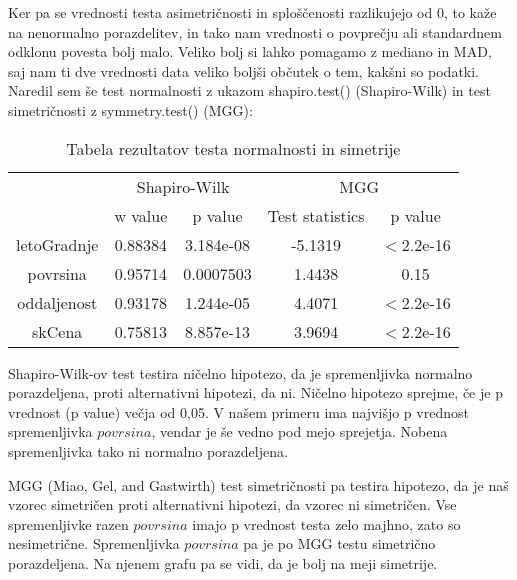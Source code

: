 \documentclass[a4paper, 12pt]{article}
\begin{document}
Ker pa se vrednosti testa asimetričnosti in sploščenosti razlikujejo od $ 0 $,
to kaže na nenormalno porazdelitev, in tako nam vrednosti o povprečju ali
standardnem odklonu povesta bolj malo. Veliko bolj si lahko pomagamo z mediano
in MAD, saj nam ti dve vrednosti data veliko boljši občutek o tem, kakšni so podatki.
Naredil sem še test normalnosti z ukazom {\sf shapiro.test()} (Shapiro-Wilk)
in test simetričnosti z {\sf symmetry.test()} (MGG):

\begin{table}[H]
\begin{center}
\begin{tabular}{ c|cc|cc }
	& \multicolumn{2}{c}{Shapiro-Wilk} & \multicolumn{2}{c}{MGG} \\
	& w value & p value & Test statistics & p value \\
	\hline
	letoGradnje &  0.88384 & 3.184e-08 & -5.1319 & $<$2.2e-16 \\
	povrsina & 0.95714 & 0.0007503 & 1.4438 & 0.15 \\
	oddaljenost & 0.93178 & 1.244e-05 & 4.4071 & $<$2.2e-16 \\
	skCena & 0.75813 & 8.857e-13 & 3.9694 & $<$2.2e-16 \\
\end{tabular}
\caption{Tabela rezultatov testa normalnosti in simetrije}
\label{table:3}
\end{center}
\end{table}

Shapiro-Wilk-ov test testira ničelno hipotezo, da je spremenljivka normalno
porazdeljena, proti alternativni hipotezi, da ni. Ničelno hipotezo sprejme, če
je p vrednost (p value) večja od 0,05. V našem primeru ima najvišjo p vrednost
spremenljivka $ povrsina $, vendar je še vedno pod mejo sprejetja. Nobena
spremenljivka tako ni normalno porazdeljena.

MGG (Miao, Gel, and Gastwirth) test simetričnosti pa testira hipotezo, da
je naš vzorec simetričen proti alternativni hipotezi, da vzorec ni simetričen.
Vse spremenljivke razen $ povrsina $ imajo p vrednost testa zelo majhno,
zato so nesimetrične. Spremenljivka $ povrsina $ pa je po MGG testu simetrično
porazdeljena. Na njenem grafu pa se vidi, da je bolj na meji simetrije.
\end{document}
